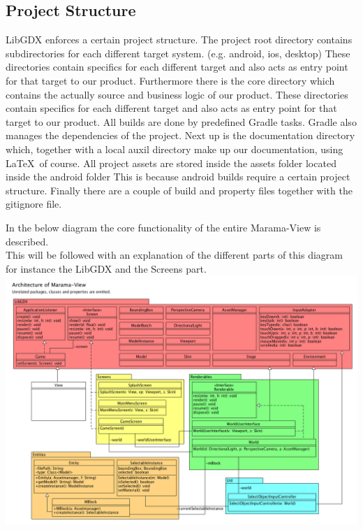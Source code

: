 \documentclass[10pt]{extarticle} %
\begin{document}
    \subsection{Project Structure}
    LibGDX enforces a certain project structure\cite{libgdxprojstruct}.
    The project root directory contains subdirectories for each different target system. (e.g. android, ios, desktop)
    These directories contain specifics for each different target and also acts as entry point for that target to our product.
    Furthermore there is the core directory which contains the actually source and business logic of our product.
    These directories contain specifics for each different target and also acts as entry point for that target to our product.
    All builds are done by predefined Gradle tasks.
    Gradle also manages the dependencies of the project.
    Next up is the documentation directory which, together with a local auxil directory make up our documentation, using \LaTeX\ of course.
    All project assets are stored inside the assets folder located inside the android folder
    This is because android builds require a certain project structure\cite{androidAssetLocation}.
    Finally there are a couple of build and property files together with the gitignore file.

    In the below diagram the core functionality of the entire Marama-View is described.\\
    This will be followed with an explanation of the different parts of this diagram for instance the LibGDX and the Screens part. \\
    \includegraphics[width=1\linewidth]{architecture-marama-view.png}
\end{document}
